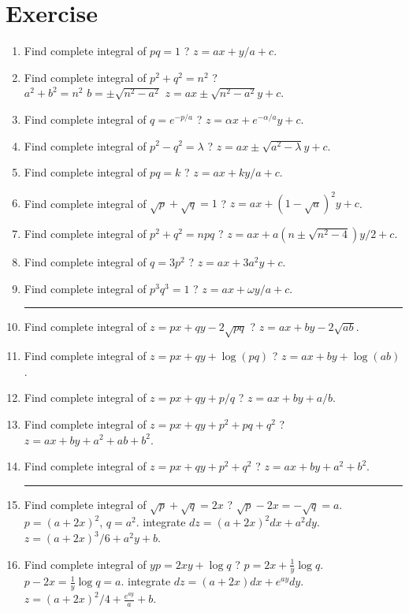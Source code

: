 \section{Exercise}
\begin{enumerate}
	\item Find complete integral of $pq = 1$ ?
	$z = ax + y/a + c$.
	\item Find complete integral of $p^2 + q^2 = n^2$ ?\\
	$a^2 + b^2 = n^2$  $b = \pm \sqrt{n^2-a^2}$
	$z = ax \pm \sqrt{n^2-a^2}y + c$.
	\item Find complete integral of $q = e^{-p/a}$ ?
	$z = \alpha x + e^{-\alpha/a} y + c$.
	\item Find complete integral of $p^2 - q^2 = \lambda$ ?
	$z = ax \pm \sqrt{a^2-\lambda}y + c$.
	\item Find complete integral of $pq = k$ ?
	$z = ax + ky/a + c$.
	\item Find complete integral of $\sqrt{p} + \sqrt{q} = 1$ ?
	$z = ax + (1-\sqrt{a})^2y + c$.
	\item Find complete integral of $p^2 + q^2 = npq$ ?
	$z = ax + a(n \pm \sqrt{n^2-4})y/2 + c$.
	\item Find complete integral of $q = 3p^2$ ?
	$z = ax + 3a^2y + c$.
	\item Find complete integral of $p^3q^3 = 1$ ?
	$z = ax + \omega y/a + c$.\\
	\hrule
	\item Find complete integral of $z = px + qy -2\sqrt{pq}$ ? $z = ax + by - 2\sqrt{ab}$.
	\item Find complete integral of $z = px + qy + \log(pq)$ ? $z = ax + by + \log(ab)$.
	\item Find complete integral of $z = px + qy + p/q$ ? $z = ax + by + a/b$.
	\item Find complete integral of $z = px + qy + p^2 + pq + q^2$ ? $z = ax + by + a^2 + ab + b^2$.
	\item Find complete integral of $z = px + qy + p^2 + q^2$ ? $z = ax + by + a^2 + b^2$.\\
	\hrule
	\item Find complete integral of $\sqrt{p} + \sqrt{q} = 2x$ ?
	$\sqrt{p}-2x = -\sqrt{q} = a$.
	$p = (a+2x)^2$, $q = a^2$.
	integrate $dz = (a+2x)^2 dx + a^2 dy$.
	$z = (a+2x)^3/6 + a^2y + b$.
	\item Find complete integral of $yp = 2xy+\log q$ ?
	$p = 2x +\frac{1}{y}\log q$. $p-2x = \frac{1}{y}\log q = a$.
	integrate $dz = (a+2x)dx + e^{ay}dy$.
	$z = (a+2x)^2/4 + \frac{e^{ay}}{a} + b$.

\end{enumerate}
